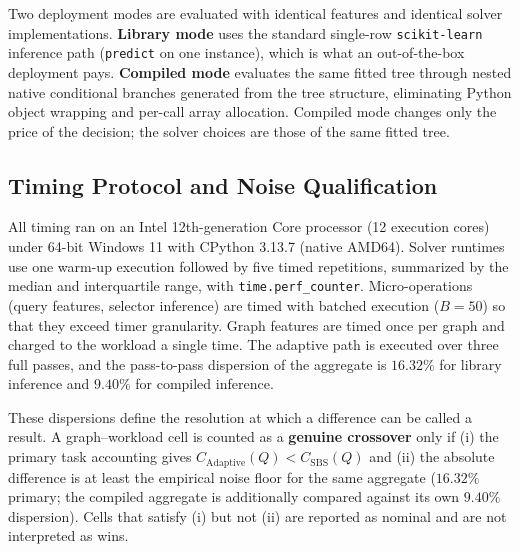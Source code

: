 \documentclass[conference]{IEEEtran}
\begin{document}
Two deployment modes are evaluated with identical features and identical solver implementations. \textbf{Library mode} uses the standard single-row \texttt{scikit-learn} inference path (\texttt{predict} on one instance), which is what an out-of-the-box deployment pays. \textbf{Compiled mode} evaluates the same fitted tree through nested native conditional branches generated from the tree structure, eliminating Python object wrapping and per-call array allocation. Compiled mode changes only the price of the decision; the solver choices are those of the same fitted tree.

\subsection{Timing Protocol and Noise Qualification}
\label{sec:timing}
All timing ran on an Intel 12th-generation Core processor (12 execution cores) under 64-bit Windows 11 with CPython 3.13.7 (native AMD64). Solver runtimes use one warm-up execution followed by five timed repetitions, summarized by the median and interquartile range, with \texttt{time.perf\_counter}. Micro-operations (query features, selector inference) are timed with batched execution ($B=50$) so that they exceed timer granularity. Graph features are timed once per graph and charged to the workload a single time. The adaptive path is executed over three full passes, and the pass-to-pass dispersion of the aggregate is $16.32\%$ for library inference and $9.40\%$ for compiled inference.

These dispersions define the resolution at which a difference can be called a result. A graph--workload cell is counted as a \textbf{genuine crossover} only if (i) the primary task accounting gives $C_{\mathrm{Adaptive}}(Q) < C_{\mathrm{SBS}}(Q)$ and (ii) the absolute difference is at least the empirical noise floor for the same aggregate ($16.32\%$ primary; the compiled aggregate is additionally compared against its own $9.40\%$ dispersion). Cells that satisfy (i) but not (ii) are reported as nominal and are not interpreted as wins.
\end{document}
